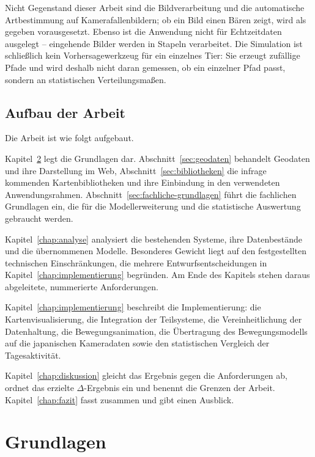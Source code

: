 \documentclass[12pt,a4paper]{report}
\begin{document}
Nicht Gegenstand dieser Arbeit sind die Bildverarbeitung und die automatische Artbestimmung
auf Kamerafallenbildern; ob ein Bild einen Bären zeigt, wird als gegeben vorausgesetzt.
Ebenso ist die Anwendung nicht für Echtzeitdaten ausgelegt -- eingehende Bilder werden in
Stapeln verarbeitet. Die Simulation ist schließlich kein Vorhersagewerkzeug für ein
einzelnes Tier: Sie erzeugt zufällige Pfade und wird deshalb nicht daran gemessen, ob ein
einzelner Pfad passt, sondern an statistischen Verteilungsmaßen.

\section{Aufbau der Arbeit}
\label{sec:aufbau}

Die Arbeit ist wie folgt aufgebaut.

Kapitel~\ref{chap:grundlagen} legt die Grundlagen dar. Abschnitt~\ref{sec:geodaten}
behandelt Geodaten und ihre Darstellung im Web, Abschnitt~\ref{sec:bibliotheken} die
infrage kommenden Kartenbibliotheken und ihre Einbindung in den verwendeten
Anwendungsrahmen. Abschnitt~\ref{sec:fachliche-grundlagen} führt die fachlichen Grundlagen
ein, die für die Modellerweiterung und die statistische Auswertung gebraucht werden.

Kapitel~\ref{chap:analyse} analysiert die bestehenden Systeme, ihre Datenbestände und die
übernommenen Modelle. Besonderes Gewicht liegt auf den festgestellten technischen
Einschränkungen, die mehrere Entwurfsentscheidungen in
Kapitel~\ref{chap:implementierung} begründen. Am Ende des Kapitels stehen daraus
abgeleitete, nummerierte Anforderungen.

Kapitel~\ref{chap:implementierung} beschreibt die Implementierung: die Kartenvisualisierung,
die Integration der Teilsysteme, die Vereinheitlichung der Datenhaltung, die
Bewegungsanimation, die Übertragung des Bewegungsmodells auf die japanischen Kameradaten
sowie den statistischen Vergleich der Tagesaktivität.

Kapitel~\ref{chap:diskussion} gleicht das Ergebnis gegen die Anforderungen ab, ordnet das
erzielte $\Delta$-Ergebnis ein und benennt die Grenzen der Arbeit.
Kapitel~\ref{chap:fazit} fasst zusammen und gibt einen Ausblick.

\chapter{Grundlagen}
\label{chap:grundlagen}
\end{document}
